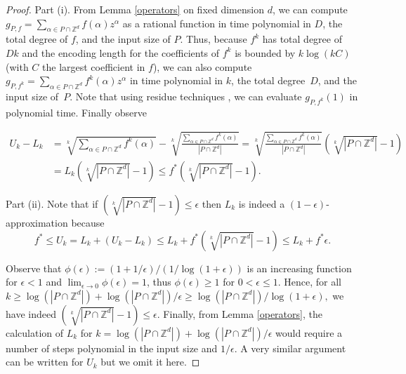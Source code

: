 \documentclass[twoside]{article}
\newcommand{\Z}{\mathbb Z}
\newcommand{\1}{{\bf 1}}
\begin{document}
\begin{proof}
\noindent  Part (i). From Lemma \ref{operators} on fixed dimension $d$, we can
compute $g_{P,f}=\sum_{\alpha\in P \cap \Z^d} f(\alpha) z^\alpha$ as a
rational function in time polynomial in $D$, the total degree of $f$,
and the input size of $P$. Thus, because $f^k$ has total degree
of~$Dk$ and the encoding length for the coefficients of $f^k$ is
bounded by $k \log (kC)$ (with $C$ the largest coefficient in $f$), we can also compute $g_{P,f^k} = \sum_{\alpha\in P \cap \Z^d}
f^k(\alpha) z^\alpha$ in time polynomial in $k$, the total degree~$D$,
and the input size of~$P$.  Note that using residue techniques
\cite{newbar}, we can evaluate $g_{P,f^k}(1)$ in polynomial time.
Finally observe

\begin{align*}
U_k-L_k&= \sqrt[k]{\sum_{\alpha \in P \cap \Z^d}
  f^k(\alpha)}-\sqrt[k]{\frac{\sum_{\alpha \in P \cap \Z^d}
  f^k(\alpha)}{|P \cap \Z^d|}} = \sqrt[k]{\frac{\sum_{\alpha \in P
  \cap \Z^d} f^k(\alpha)}{|P \cap \Z^d|}} \left( \sqrt[k]{|P \cap
  \Z^d|}-1 \right) \\
& =L_k \left( \sqrt[k]{|P \cap \Z^d|}-1 \right) \leq f^*
  \left(\sqrt[k]{|P \cap \Z^d|}-1 \right). 
\end{align*}

\noindent Part (ii). Note that if $\left(\sqrt[k]{|P \cap \Z^d|}-1 \right) \leq
\epsilon$ then $L_k$ is indeed a $(1-\epsilon)$-approximation because 
$$
f^* \leq U_k =L_k+(U_k-L_k) \leq L_k + f^*\left(\sqrt[k]{|P \cap
    \Z^d|}-1 \right) \leq L_k +f^* \epsilon.$$

Observe that $\phi(\epsilon) := (1+1/\epsilon)/(1/\log(1+\epsilon))$ is an
increasing function for $\epsilon <1$ and $\lim_{\epsilon \rightarrow
  0}\phi(\epsilon)=1$, thus $\phi(\epsilon)\geq 1$ for $0<\epsilon\leq1$. 
Hence, for all 
$k \geq \log({|P \cap \Z^d|})+\log({|P \cap
  \Z^d|})/\epsilon \geq \log({|P \cap \Z^d|})/\log(1+\epsilon),$ 
we have indeed $\left(\sqrt[k]{|P \cap \Z^d|}-1 \right) \leq \epsilon.$
Finally, from Lemma \ref{operators}, the calculation of $L_k$ for
$k=\log({|P \cap \Z^d|})+\log({|P \cap \Z^d|})/\epsilon$ would require a
number of steps polynomial in the input size and $1/\epsilon$. A
very similar argument can be written for $U_k$ but we omit it here.


%


\end{proof}
\end{document}

